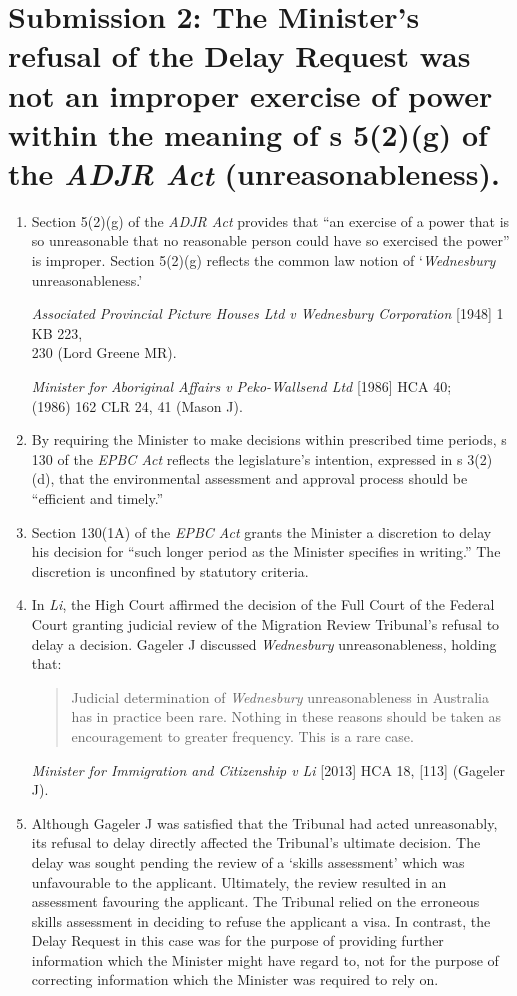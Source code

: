 \documentclass[12pt]{article}
\begin{document}
\section{Submission 2: The Minister's refusal of the Delay Request was
not an improper exercise of power within the meaning of s 5(2)(g) of the
\emph{ADJR Act} (unreasonableness).}

\begin{enumerate}[1.]
\item
  Section 5(2)(g) of the \emph{ADJR Act} provides that ``an exercise of
  a power that is so unreasonable that no reasonable person could have
  so exercised the power'' is improper. Section 5(2)(g) reflects the
  common law notion of `\emph{Wednesbury} unreasonableness.'

  \emph{Associated Provincial Picture Houses Ltd v Wednesbury
  Corporation} {[}1948{]} 1 KB 223, \\ 230 (Lord Greene MR).

  \emph{Minister for Aboriginal Affairs v Peko-Wallsend Ltd} {[}1986{]}
  HCA 40; \\(1986) 162 CLR 24, 41 (Mason J).
\item
  By requiring the Minister to make decisions within prescribed time
  periods, s 130 of the \emph{EPBC Act} reflects the legislature's
  intention, expressed in s 3(2)(d), that the environmental assessment
  and approval process should be ``efficient and timely.''
\item
  Section 130(1A) of the \emph{EPBC Act} grants the Minister a
  discretion to delay his decision for ``such longer period as the
  Minister specifies in writing.'' The discretion is unconfined by
  statutory criteria.
\item
  In \emph{Li}, the High Court affirmed the decision of the Full Court
  of the Federal Court granting judicial review of the Migration Review
  Tribunal's refusal to delay a decision. Gageler J discussed
  \emph{Wednesbury} unreasonableness, holding that:

  \begin{quote}
  Judicial determination of \emph{Wednesbury} unreasonableness in
  Australia has in practice been rare. Nothing in these reasons should
  be taken as encouragement to greater frequency. This is a rare case.
  \end{quote}

  \emph{Minister for Immigration and Citizenship v Li} {[}2013{]} HCA
  18, {[}113{]} (Gageler J).
\item
  Although Gageler J was satisfied that the Tribunal had acted
  unreasonably, its refusal to delay directly affected the Tribunal's
  ultimate decision. The delay was sought pending the review of a
  `skills assessment' which was unfavourable to the applicant.
  Ultimately, the review resulted in an assessment favouring the
  applicant. The Tribunal relied on the erroneous skills assessment in
  deciding to refuse the applicant a visa. In contrast, the Delay
  Request in this case was for the purpose of providing further
  information which the Minister might have regard to, not for the
  purpose of correcting information which the Minister was required to
  rely on.


\end{enumerate}
\end{document}
